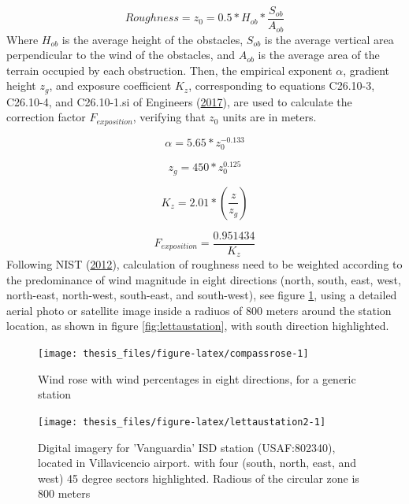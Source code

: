\documentclass[12pt,oneside]{reedthesis}
\begin{document}
\[
Roughness = z_0= 0.5 * H_{ob}*\frac{S_{ob}}{A_{ob}}
\]
Where \(H_{ob}\) is the average height of the obstacles, \(S_{ob}\) is the average vertical area perpendicular to the wind of the obstacles, and \(A_{ob}\) is the average area of the terrain occupied by each obstruction. Then, the empirical exponent \(\alpha\), gradient height \(z_g\), and exposure coefficient \(K_z\), corresponding to equations C26.10-3, C26.10-4, and C26.10-1.si of Engineers (\protect\hyperlink{ref-Asce2017}{2017}), are used to calculate the correction factor \(F_{exposition}\), verifying that \(z_0\) units are in meters.

\[
\alpha =  5.65*z_0^{-0.133}
\]

\[
z_g=450*z_0^{0.125}
\]

\[
K_z= 2.01*\left(\frac{z}{z_g}\right)
\]

\[
F_{exposition} = \frac{0.951434}{K_z}
\]
Following NIST (\protect\hyperlink{ref-nist2012}{2012}), calculation of roughness need to be weighted according to the predominance of wind magnitude in eight directions (north, south, east, west, north-east, north-west, south-east, and south-west), see figure \ref{fig:compassrose}, using a detailed aerial photo or satellite image inside a radiuos of 800 meters around the station location, as shown in figure \ref{fig:lettaustation}, with south direction highlighted.
\begin{figure}

{\centering \texttt{[image: thesis\_files/figure-latex/compassrose-1]} 

}

\caption{Wind rose with wind percentages in eight directions, for a generic station}\label{fig:compassrose}
\end{figure}
\footnotesize
\begin{figure}

{\centering \texttt{[image: thesis\_files/figure-latex/lettaustation2-1]} 

}

\caption{Digital imagery for 'Vanguardia' ISD station (USAF:802340), located in Villavicencio airport. with four (south, north, east, and west) 45 degree sectors highlighted. Radious of the circular zone is 800 meters}\label{fig:lettaustation2}
\end{figure}
\normalsize
\end{document}
